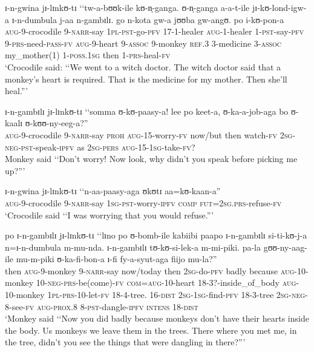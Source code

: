 \begin{exe}
\ex \gll ɪ-n-gwina jɪ-lɪnkʊ-tɪ \lq\lq tw-a-bʊʊk-ile kʊ-n̩-ganga. ʊ-n̩-ganga a-a-t-ile jɪ-kʊ-lond-igw-a ɪ-n-dumbula j-aa n-gambɪlɪ. go n-kota gw-a jʊʊba gw-angʊ. po i-kʊ-pon-a\\
\textsc{aug}-9-crocodile 9-\textsc{narr}-say \phantom{\lq\lq}\textsc{1pl}-\textsc{pst}-go-\textsc{pfv} 17-1-healer \textsc{aug}-1-healer 1-\textsc{pst}-say-\textsc{pfv} 9-\textsc{prs}-need-\textsc{pass}-\textsc{fv} \textsc{aug}-9-heart 9-\textsc{assoc} 9-monkey \textsc{ref.3} 3-medicine 3-\textsc{assoc} my\_mother(1) 1-\textsc{poss.1sg} then 1-\textsc{prs}-heal-\textsc{fv}\\
\glt \lq Crocodile said: \lq\lq We went to a witch doctor. The witch doctor said that a monkey's heart is required. That is the medicine for my mother. Then she'll heal.''{}'

\ex \gll ɪ-n-gambɪlɪ jɪ-lɪnkʊ-tɪ \lq\lq somma ʊ-kʊ-paasy-a! lee po keet-a, ʊ-ka-a-job-aga bo ʊ-kaalɪ ʊ-kʊʊ-ny-eeg-a?''\\
\textsc{aug}-9-crocodile 9-\textsc{narr}-say \phantom{\lq\lq}\textsc{proh} \textsc{aug}-15-worry-\textsc{fv} now/but then watch-\textsc{fv} \textsc{2sg}-\textsc{neg}-\textsc{pst}-speak-\textsc{ipfv} as \textsc{2sg}-\textsc{pers} \textsc{aug}-15-\textsc{1sg}-take-\textsc{fv}?\\
\glt Monkey said \lq\lq Don't worry! Now look, why didn't you speak before picking me up?''{}'

\ex \gll ɪ-n-gwina jɪ-lɪnkʊ-tɪ \lq\lq n-aa-paasy-aga ʊkʊtɪ aa=kʊ-kaan-a''\\
\textsc{aug}-9-crocodile 9-\textsc{narr}-say \phantom{\lq\lq}\textsc{1sg}-\textsc{pst}-worry-\textsc{ipfv} \textsc{comp} \textsc{fut}=\textsc{2sg.prs}-refuse-\textsc{fv}\\
\glt \lq Crocodile said \lq\lq I was worrying that you would refuse.''{}'

\ex \gll po ɪ-n-gambɪlɪ jɪ-lɪnkʊ-tɪ \lq\lq lɪno po ʊ-bomb-ile kabiibi paapo ɪ-n-gambɪlɪ si-ti-kʊ-j-a n=ɪ-n-dumbula m-mu-nda. ɪ-n-gambɪlɪ tʊ-kʊ-si-lek-a m-mi-piki. pa-la gʊʊ-ny-aag-ile mu-m-piki ʊ-ka-fi-bon-a ɪ-fi fy-a-syut-aga fiijo mu-la?''\\
then \textsc{aug}-9-monkey 9-\textsc{narr}-say \phantom{\lq\lq}now/today then \textsc{2sg}-do-\textsc{pfv} badly because \textsc{aug}-10-monkey 10-\textsc{neg}-\textsc{prs}-be(come)-\textsc{fv} \textsc{com}=\textsc{aug}-10-heart 18-3?-inside\_of\_body \textsc{aug}-10-monkey \textsc{1pl}-\textsc{prs}-10-let-\textsc{fv} 18-4-tree. 16-\textsc{dist} \textsc{2sg}-\textsc{1sg}-find-\textsc{pfv} 18-3-tree \textsc{2sg}-\textsc{neg}-8-see-\textsc{fv} \textsc{aug}-\textsc{prox.8} 8-\textsc{pst}-dangle-\textsc{ipfv} \textsc{intens} 18-\textsc{dist}\\
\glt \lq Monkey said \lq\lq Now you did badly because monkeys don't have their hearts inside the body. Us monkeys we leave them in the trees. There where you met me, in the tree, didn't you see the things that were dangling in there?''{}'


\end{exe}
